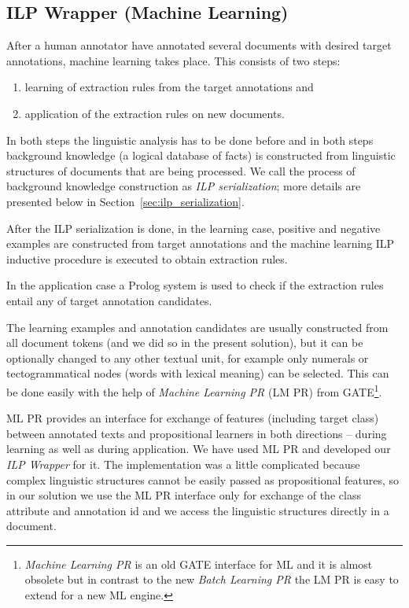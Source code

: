\subsection{ILP Wrapper (Machine Learning)}
After a human annotator have annotated several documents with desired target annotations, machine learning takes place. 
This consists of two steps: 
\begin{enumerate}
	\item learning of extraction rules from the target annotations and
	\item application of the extraction rules on new documents.
\end{enumerate}
In both steps the linguistic analysis has to be done before and in both steps background knowledge (a logical database of facts) is constructed from linguistic structures of documents that are being processed. We call the process of background knowledge construction as \emph{ILP serialization}; more details are presented below in Section~\ref{sec:ilp_serialization}.

After the ILP serialization is done, in the learning case, positive and negative examples are constructed from target annotations and the machine learning ILP inductive procedure is executed to obtain extraction rules.

In the application case a Prolog system is used to check if the extraction rules entail any of target annotation candidates.




The learning examples and annotation candidates are usually constructed from all document tokens (and we did so in the present solution), but it can be optionally changed to any other textual unit, for example only numerals or tectogrammatical nodes (words with lexical meaning) can be selected. This can be done easily with the help of \emph{Machine Learning PR} (LM PR) from GATE\footnote{\emph{Machine Learning PR} is an old GATE interface for ML and it is almost obsolete but in contrast to the new \emph{Batch Learning PR} the LM PR is easy to extend for a new ML engine.}.

ML PR provides an interface for exchange of features (including target class) between annotated texts and propositional learners in both directions -- during learning as well as during application. We have used ML PR and developed our \emph{ILP Wrapper} for it. The implementation was a little complicated because complex linguistic structures cannot be easily passed as propositional features, so in our solution we use the ML PR interface only for exchange of the class attribute and annotation id and we access the linguistic structures directly in a document.



